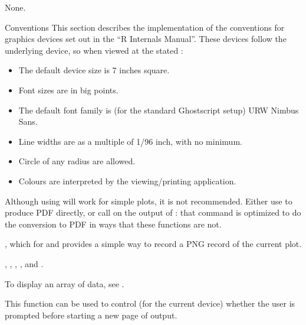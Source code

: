 %
\begin{Value}
None.
\end{Value}
%
\begin{Section}{Conventions}
This section describes the implementation of the conventions for
graphics devices set out in the ``R Internals Manual''.  These
devices follow the underlying device, so when viewed at the stated
:

\begin{itemize}

\item The default device size is 7 inches square.
\item Font sizes are in big points.
\item The default font family is (for the standard Ghostscript
setup) URW Nimbus Sans.
\item Line widths are as a multiple of 1/96 inch, with no minimum. 
\item Circle of any radius are allowed.
\item Colours are interpreted by the viewing/printing application.

\end{itemize}

\end{Section}
%
\begin{Note}\relax
Although using  will work for simple plots, it
is not recommended.  Either use  to produce PDF
directly, or call  on the
output of : that command is optimized to do
the conversion to PDF in ways that these functions are not.
\end{Note}
%
\begin{SeeAlso}\relax
{}, which for  and
 provides a simple way to record a PNG
record of the current plot.

, , ,
,  and  .

To display an array of data, see .
\end{SeeAlso}
%
\begin{Description}\relax
This function can be used to control (for the current device)
whether the user is prompted before starting a new page of output.
\end{Description}
